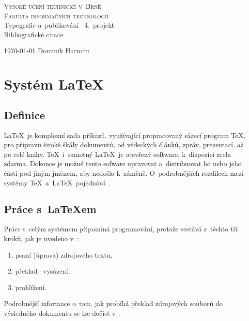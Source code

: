\documentclass[a4paper, 11pt]{article}
\begin{document}
	\begin{titlepage}
		\begin{center}
			\Huge
			\textsc{Vysoké učení technické v~Brně} \\
			\huge
			\textsc{Fakulta informačních technologií} \\
			\LARGE
			Typografie a~publikování\,--\,4.~projekt \\
			\Huge
			Bibliografické citace
		\end{center}

		{\Large
			\today
			\hfill
			Dominik Harmim
		}
	\end{titlepage}


	\section{Systém \LaTeX}

	\subsection{Definice}
	\LaTeX\ je komplexní sada příkazů, využívající propracovaný sázecí program \TeX, pro přípravu široké
	škály dokumentů, od vědeckých článků, zpráv, prezentací, až po celé knihy. \TeX\ i~samotný \LaTeX\ je
	otevřený software, k~dispozici zcela zdarma. Dokonce je možné tento sofware upravovat a~distribuovat
	ho nebo jeho části pod jiným jménem, aby nedošlo k~záměně. O~podrobnějších rozdílech mezi systémy
	\TeX\ a~\LaTeX\ pojednává \cite{Kopkac2004}.


	\subsection{Práce s~{\LaTeX}em}
	Práce s~celým systémem připomíná programování, protože sestává z~těchto tří kroků, jak je uvedeno
	v~\cite{Rybicka2003}:
	\begin{enumerate}
		\item psaní (úprava) zdrojového textu,
		\item překlad\,--\,vysázení,
		\item prohlížení.
	\end{enumerate}
	Podrobnější informace o~tom, jak probíhá překlad zdrojových souborů do výsledného dokumentu se lze
	dočíst v~\cite{Rybicka2003}.
\end{document}
